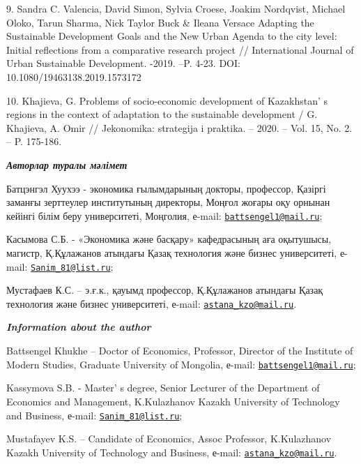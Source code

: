 \begin{references}
9. Sandra C. Valencia, David Simon, Sylvia Croese, Joakim Nordqvist,
Michael Oloko, Tarun Sharma, Nick Taylor Buck \& Ileana Versace Adapting
the Sustainable Development Goals and the New Urban Agenda to the city
level: Initial reflections from a comparative research project //
International Journal of Urban Sustainable Development. -2019. --P.
4-23.
DOI: 10.1080/19463138.2019.1573172

10. Khajieva, G. Problems of socio-economic development of
Kazakhstan' s regions in the context of adaptation to the
sustainable development / G. Khajieva, A. Omir // Jekonomika: strategija
i praktika. -- 2020. -- Vol. 15, No. 2. -- P. 175-186.
\end{references}

\begin{authorinfo}
\hspace{1em}\emph{{\bfseries Авторлар туралы мәлімет}}

Батцэнгэл Хуухээ - экономика ғылымдарының докторы, профессор, Қазіргі
заманғы зерттеулер институтының директоры, Моңғол жоғары оқу орнынан
кейінгі білім беру университеті, Моңголия, е-mail:
\href{mailto:battsengel1@mail.ru}{\nolinkurl{battsengel1@mail.ru}};

Касымова С.Б. - «Экономика және басқару» кафедрасының аға оқытушысы,
магистр, Қ.Құлажанов атындағы Қазақ технология және бизнес университеті,
е-mail: \href{mailto:Sanim_81@list.ru}{\nolinkurl{Sanim\_81@list.ru}};

Мустафаев К.С. -- э.ғ.к., қауымд профессор, Қ.Құлажанов атындағы Қазақ
технология және бизнес университеті, е-mail:
\href{mailto:astana_kzo@mail.ru}{\nolinkurl{astana\_kzo@mail.ru}}.

\hspace{1em}\emph{{\bfseries Information about the author}}

Battsengel Khukhe -- Doctor of Economics, Professor, Director of the
Institute of Modern Studies, Graduate University of Mongolia, е-mail:
\href{mailto:battsengel1@mail.ru}{\nolinkurl{battsengel1@mail.ru}};

Kassymova S.B. - Master' s degree, Senior Lecturer of the
Department of Economics and Management, K.Kulazhanov Kazakh University
of Technology and Business, е-mail:
\href{mailto:Sanim_81@list.ru}{\nolinkurl{Sanim\_81@list.ru}};

Mustafayev K.S. -- Candidate of Economics, Assoc Professor, K.Kulazhanov
Kazakh University of Technology and Business, е-mail:
\href{mailto:astana_kzo@mail.ru}{\nolinkurl{astana\_kzo@mail.ru}}.
\end{authorinfo}
